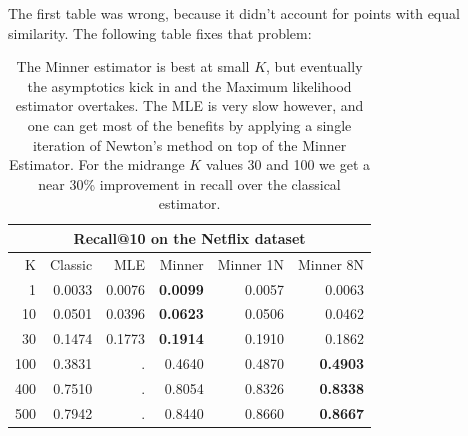 %

The first table was wrong, because it didn't account for points with equal similarity.
The following table fixes that problem:
\begin{table}
\centering
 \begin{tabular}{|r| r r r r r|} 
 \hline
     \multicolumn{6}{|c|}{Recall@10 on the Netflix dataset} \\
 \hline
 K  & Classic & MLE & Minner & Minner 1N & Minner 8N \\
 \hline
    1 & 0.0033 & 0.0076 & \textbf{ 0.0099} & 0.0057 & 0.0063 \\
  10 & 0.0501 & 0.0396 & \textbf{ 0.0623} & 0.0506 & 0.0462 \\
  30 & 0.1474 & 0.1773 & \textbf{ 0.1914} & 0.1910 & 0.1862 \\
 100 & 0.3831 &      . & 0.4640 & 0.4870 & \textbf{ 0.4903} \\
 400 & 0.7510 &      . & 0.8054 & 0.8326 & \textbf{ 0.8338} \\
 500 & 0.7942 &      . & 0.8440 & 0.8660 & \textbf{ 0.8667} \\
  \hline
 \end{tabular}
 \caption{The Minner estimator is best at small $K$, but eventually the asymptotics kick in and the Maximum likelihood estimator overtakes. The MLE is very slow however, and one can get most of the benefits by applying a single iteration of Newton's method on top of the Minner Estimator.
    For the midrange $K$ values 30 and 100 we get a near 30\% improvement in recall over the classical estimator.
 }
 \label{tab:netflix}
\end{table}

